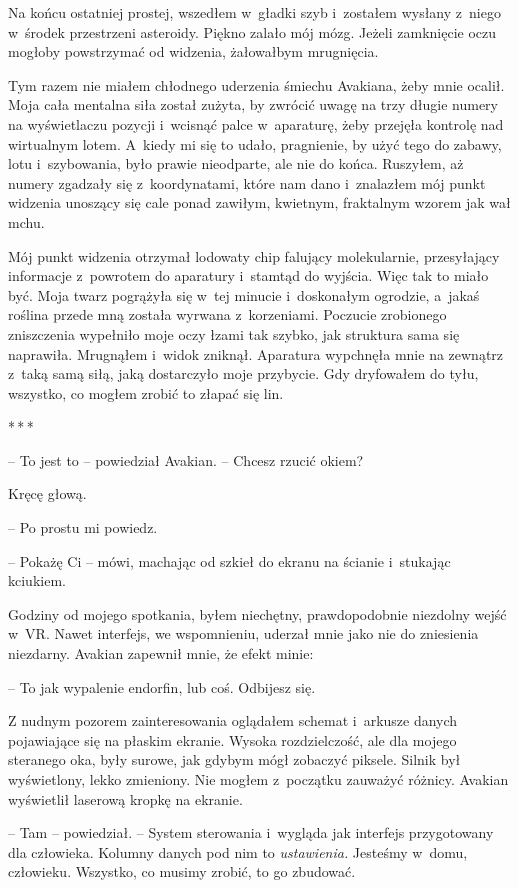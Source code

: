 \documentclass[oneside,polish,12pt,sfheadings]{mwbk}
\newcommand{\threeast}{\bigskip\par\centerline{*\,*\,*}\medskip\par}%
\begin{document}
Na końcu ostatniej prostej, wszedłem w~gładki szyb i~zostałem wysłany z~niego w~środek przestrzeni asteroidy. Piękno zalało mój mózg. Jeżeli
zamknięcie oczu mogłoby powstrzymać od widzenia, żałowałbym mrugnięcia.

Tym razem nie miałem chłodnego uderzenia śmiechu Avakiana, żeby mnie
ocalił. Moja cała mentalna siła został zużyta, by zwrócić uwagę na trzy
długie numery na wyświetlaczu pozycji i~wcisnąć palce w~aparaturę, żeby
przejęła kontrolę nad wirtualnym lotem. A~kiedy mi się to udało,
pragnienie, by użyć tego do zabawy, lotu i~szybowania, było prawie
nieodparte, ale nie do końca. Ruszyłem, aż numery zgadzały się z~koordynatami, które nam dano i~znalazłem mój punkt widzenia unoszący się
cale ponad zawiłym, kwietnym, fraktalnym wzorem jak wał mchu.

Mój punkt widzenia otrzymał lodowaty chip falujący molekularnie,
przesyłający informacje z~powrotem do aparatury i~stamtąd do wyjścia.
Więc tak to miało być. Moja twarz pogrążyła się w~tej minucie i~doskonałym ogrodzie, a~jakaś roślina przede mną została wyrwana z~korzeniami. Poczucie zrobionego zniszczenia wypełniło moje oczy łzami
tak szybko, jak struktura sama się naprawiła. Mrugnąłem i~widok zniknął.
Aparatura wypchnęła mnie na zewnątrz z~taką samą siłą, jaką dostarczyło
moje przybycie. Gdy dryfowałem do tyłu, wszystko, co mogłem zrobić to
złapać się lin.

\threeast

-- To jest to -- powiedział Avakian. -- Chcesz rzucić okiem?

Kręcę głową. 

-- Po prostu mi powiedz.

-- Pokażę Ci -- mówi, machając od szkieł do ekranu na ścianie i~stukając
kciukiem.

Godziny od mojego spotkania, byłem niechętny, prawdopodobnie niezdolny
wejść w~VR. Nawet interfejs, we wspomnieniu, uderzał mnie jako nie do
zniesienia niezdarny. Avakian zapewnił mnie, że efekt minie: 

-- To jak
wypalenie endorfin, lub coś. Odbijesz się.

Z nudnym pozorem zainteresowania oglądałem schemat i~arkusze danych
pojawiające się na płaskim ekranie. Wysoka rozdzielczość, ale dla mojego
steranego oka, były surowe, jak gdybym mógł zobaczyć piksele. Silnik był
wyświetlony, lekko zmieniony. Nie mogłem z~początku zauważyć różnicy.
Avakian wyświetlił laserową kropkę na ekranie.

-- Tam -- powiedział. -- System sterowania i~wygląda jak interfejs
przygotowany dla człowieka. Kolumny danych pod nim to \emph{ustawienia.
} Jesteśmy w~domu, człowieku. Wszystko, co musimy zrobić, to go
zbudować.
\end{document}
